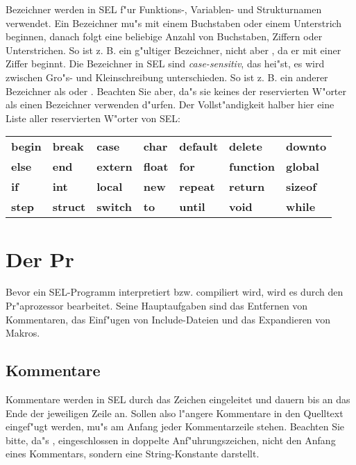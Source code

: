 Bezeichner werden in SEL f"ur Funktions-, Variablen- und
Strukturnamen
verwendet. Ein Bezeichner mu"s mit einem Buchstaben
oder einem Unterstrich beginnen, danach folgt eine beliebige
Anzahl von Buchstaben, Ziffern oder Unterstrichen. So ist z. B.
 ein g"ultiger Bezeichner, nicht aber
, da er mit einer Ziffer beginnt. Die Bezeichner in SEL
sind {\em case-sensitiv}, das hei"st, es wird zwischen Gro"s-
und Kleinschreibung unterschieden. So ist z. B.  ein
anderer Bezeichner als  oder . Beachten
Sie aber, da"s sie keines der reservierten W"orter
als einen Bezeichner verwenden d"urfen. Der Vollst"andigkeit halber hier
eine Liste aller reservierten W"orter von SEL:

\medskip
\begin{tabular}{lllllll}
\bf begin & \bf break  & \bf case   & \bf char  & \bf default & \bf delete   & \bf downto \\
\bf else  & \bf end    & \bf extern & \bf float & \bf for     & \bf function & \bf global \\
\bf if    & \bf int    & \bf local  & \bf new   & \bf repeat  & \bf return   & \bf sizeof \\
\bf step  & \bf struct & \bf switch & \bf to    & \bf until   & \bf void     & \bf while  \\
\end{tabular}

\chapter{Der Pr}

Bevor ein SEL-Programm interpretiert bzw. compiliert wird, wird
es durch den Pr"aprozessor bearbeitet. Seine Hauptaufgaben sind
das Entfernen von Kommentaren, das Einf"ugen von Include-Dateien
und das Expandieren von Makros.

\section{Kommentare}

Kommentare werden in SEL durch das Zeichen \fu{//} eingeleitet
und dauern bis an das Ende der jeweiligen Zeile an. Sollen also
l"angere Kommentare in den Quelltext eingef"ugt werden, mu"s am
Anfang jeder Kommentarzeile \fu{//} stehen. Beachten Sie bitte,
da"s \fu{//}, eingeschlossen in doppelte Anf"uhrungszeichen, nicht
den Anfang eines Kommentars, sondern eine String-Konstante
darstellt.

